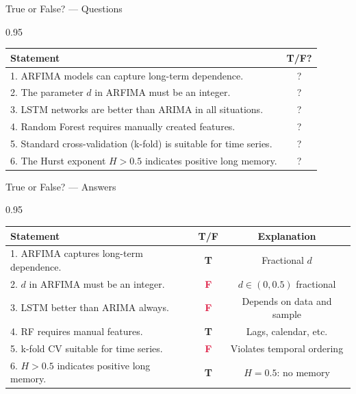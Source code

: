 \documentclass[9pt, aspectratio=169, t]{beamer}
\begin{document}
\begin{frame}{True or False? --- Questions}
    \begin{cminipage}{0.95\textwidth}
    \footnotesize
    \begin{center}
    \begin{tabular}{p{9cm}c}
        \toprule
        \textbf{Statement} & \textbf{T/F?} \\
        \midrule
        1. ARFIMA models can capture long-term dependence. & ? \\[0.15cm]
        2. The parameter $d$ in ARFIMA must be an integer. & ? \\[0.15cm]
        3. LSTM networks are better than ARIMA in all situations. & ? \\[0.15cm]
        4. Random Forest requires manually created features. & ? \\[0.15cm]
        5. Standard cross-validation (k-fold) is suitable for time series. & ? \\[0.15cm]
        6. The Hurst exponent $H > 0.5$ indicates positive long memory. & ? \\
        \bottomrule
    \end{tabular}
    \end{center}
    \end{cminipage}
\end{frame}

\begin{frame}{True or False? --- Answers}
    \begin{cminipage}{0.95\textwidth}
    \scriptsize
    \begin{center}
    \begin{tabular}{p{7.5cm}cc}
        \toprule
        \textbf{Statement} & \textbf{T/F} & \textbf{Explanation} \\
        \midrule
        1. ARFIMA captures long-term dependence. & \textcolor{Forest}{\textbf{T}} & {\tiny Fractional $d$} \\[0.08cm]
        2. $d$ in ARFIMA must be an integer. & \textcolor{Crimson}{\textbf{F}} & {\tiny $d \in (0, 0.5)$ fractional} \\[0.08cm]
        3. LSTM better than ARIMA always. & \textcolor{Crimson}{\textbf{F}} & {\tiny Depends on data and sample} \\[0.08cm]
        4. RF requires manual features. & \textcolor{Forest}{\textbf{T}} & {\tiny Lags, calendar, etc.} \\[0.08cm]
        5. k-fold CV suitable for time series. & \textcolor{Crimson}{\textbf{F}} & {\tiny Violates temporal ordering} \\[0.08cm]
        6. $H > 0.5$ indicates positive long memory. & \textcolor{Forest}{\textbf{T}} & {\tiny $H = 0.5$: no memory} \\
        \bottomrule
    \end{tabular}
    \end{center}
    \end{cminipage}
\end{frame}
\end{document}

